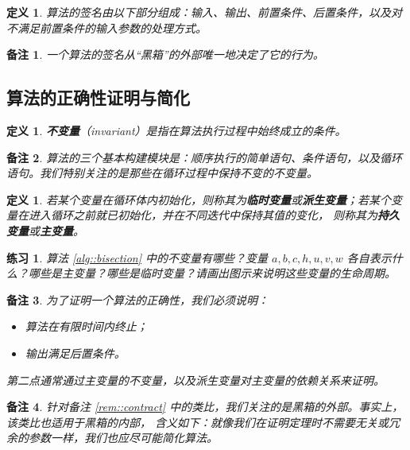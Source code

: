 \documentclass[a4paper]{ctexart}
\newtheorem{remark}{备注}
\newtheorem{definition}[theorem]{定义} %
\newtheorem{exercise}[theorem]{练习}
\numberwithin{theorem}{section}
\numberwithin{equation}{section}
\numberwithin{figure}{section}
\numberwithin{remark}{section}
\begin{document}
\begin{definition}
算法的签名由以下部分组成：输入、输出、前置条件、后置条件，以及对不满足前置条件的输入参数的处理方式。
\end{definition}

\begin{remark}
一个算法的签名从“黑箱”的外部唯一地决定了它的行为。
\end{remark}


\subsection{算法的正确性证明与简化}

\begin{definition}
\textbf{不变量}（invariant）是指在算法执行过程中始终成立的条件。
\end{definition}

\begin{remark}
算法的三个基本构建模块是：顺序执行的简单语句、条件语句，以及循环语句。我们特别关注的是那些在循环过程中保持不变的不变量。
\end{remark}

\begin{definition}
若某个变量在循环体内初始化，则称其为\textbf{临时变量}或\textbf{派生变量}；若某个变量在进入循环之前就已初始化，并在不同迭代中保持其值的变化，
则称其为\textbf{持久变量}或\textbf{主变量}。    
\end{definition}

\begin{exercise}
算法 \ref{alg::bisection} 中的不变量有哪些？变量 \(a, b, c, h, u, v, w\) 各自表示什么？哪些是主变量？哪些是临时变量？请画出图示来说明这些变量的生命周期。    
\end{exercise}

\begin{remark}
为了证明一个算法的正确性，我们必须说明：
\begin{itemize}
  \item 算法在有限时间内终止；
  \item 输出满足后置条件。
\end{itemize}

第二点通常通过主变量的不变量，以及派生变量对主变量的依赖关系来证明。
\end{remark}

\begin{remark}
针对备注 \ref{rem::contract} 中的类比，我们关注的是黑箱的外部。事实上，该类比也适用于黑箱的内部，
含义如下：就像我们在证明定理时不需要无关或冗余的参数一样，我们也应尽可能简化算法。
\end{remark}
\end{document}
